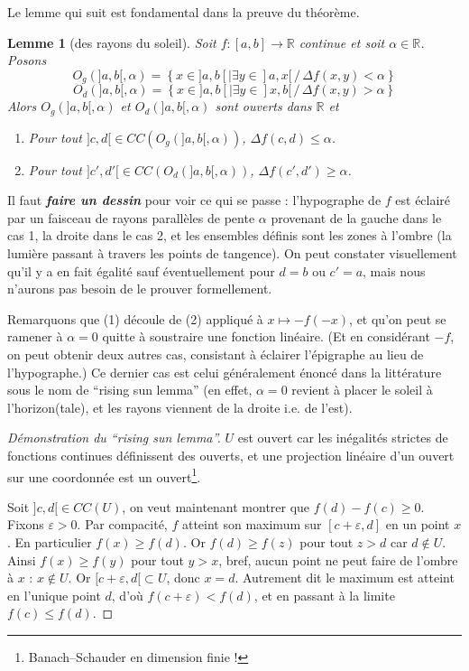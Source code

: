 \documentclass[a4paper, 11pt]{article}
\def\R{\mathbb{R}}
\newtheorem*{lemma}{Lemme}
\begin{document}
Le lemme qui suit est fondamental dans la preuve du théorème.

\begin{lemma}[des rayons du soleil]
  Soit $f : [a,b] \to \R$ continue et soit $\alpha \in \R$. Posons
  \[ O_g(]a,b[,\alpha)  = \left\{ x \in ]a,b[ | \exists y \in ]a,x[\,/\,
      \Delta f(x,y) < \alpha \right\} \]
  \[ O_d(]a,b[,\alpha) = \left\{ x \in ]a,b[ | \exists y \in ]x,b[\,/\,
      \Delta f(x,y) > \alpha \right\}
  \]
  Alors $O_g(]a,b[,\alpha)$ et $O_d(]a,b[,\alpha)$ sont ouverts dans $\R$ et
  \begin{enumerate}
  \item Pour tout $]c,d[ \in CC(O_g(]a,b[,\alpha))$,
    $\displaystyle \Delta f(c,d) \leq \alpha$.
  \item Pour tout $]c',d'[ \in CC(O_d(]a,b[,\alpha))$,
    $\displaystyle \Delta f(c',d') \geq \alpha$.
  \end{enumerate}
\end{lemma}
Il faut \textit{\textbf{faire un dessin}} pour voir ce qui se passe :
l'hypographe de $f$ est éclairé par un faisceau de rayons parallèles de pente
$\alpha$ provenant de la gauche dans le cas 1, la droite dans le cas 2, et les
ensembles définis sont les zones à l'ombre (la lumière passant à travers les
points de tangence). On peut constater visuellement qu'il y a en fait égalité
sauf éventuellement pour $d = b$ ou $c' = a$, mais nous n'aurons pas besoin de
le prouver formellement.

Remarquons que (1) découle de (2) appliqué à $x \mapsto -f(-x)$, et qu'on peut
se ramener à $\alpha = 0$ quitte à soustraire une fonction linéaire. (Et en
considérant $-f$, on peut obtenir deux autres cas, consistant à éclairer
l'épigraphe au lieu de l'hypographe.) Ce dernier cas est celui généralement
énoncé dans la littérature sous le nom de \enquote{rising sun lemma} (en effet,
$\alpha = 0$ revient à placer le soleil à l'horizon(tale), et les rayons
viennent de la droite i.e. de l'est).

\begin{proof}[Démonstration du \enquote{rising sun lemma}]
  $U$ est ouvert car les inégalités strictes de fonctions continues définissent
  des ouverts, et une projection linéaire d'un ouvert sur une coordonnée
  est un ouvert\footnote{Banach--Schauder en dimension finie !}.

  Soit $]c,d[ \in CC(U)$, on veut maintenant montrer que $f(d) - f(c) \geq 0$.
  Fixons $\varepsilon > 0$. Par compacité, $f$ atteint son maximum sur
  $[c+\varepsilon, d]$ en un point $x$. En particulier $f(x) \geq f(d)$. Or
  $f(d) \geq f(z)$ pour tout $z > d$ car $d \not\in U$. Ainsi $f(x) \geq f(y)$
  pour tout $y > x$, bref, aucun point ne peut faire de l'ombre à $x$ : $x
  \not\in U$. Or $[c+\varepsilon,d[ \subset U$, donc $x = d$. Autrement dit le
  maximum est atteint en l'unique point $d$, d'où $f(c+\varepsilon) < f(d)$, et
  en passant à la limite $f(c) \leq f(d)$.
\end{proof}
\end{document}
